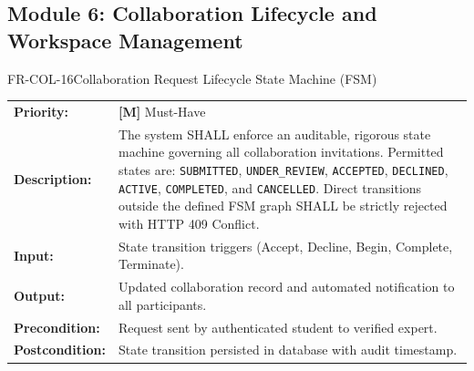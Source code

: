 \documentclass[11pt,a4paper]{article}
\begin{document}
\subsection{Module 6: Collaboration Lifecycle and Workspace Management}

\begin{reqbox}{FR-COL-16}{Collaboration Request Lifecycle State Machine (FSM)}
\begin{tabularx}{\textwidth}{@{}lX@{}}
\textbf{Priority:} & \textbf{[M]} Must-Have \\
\textbf{Description:} & The system SHALL enforce an auditable, rigorous state machine governing all collaboration invitations. Permitted states are: \texttt{SUBMITTED}, \texttt{UNDER\_REVIEW}, \texttt{ACCEPTED}, \texttt{DECLINED}, \texttt{ACTIVE}, \texttt{COMPLETED}, and \texttt{CANCELLED}. Direct transitions outside the defined FSM graph SHALL be strictly rejected with HTTP 409 Conflict. \\
\textbf{Input:} & State transition triggers (Accept, Decline, Begin, Complete, Terminate). \\
\textbf{Output:} & Updated collaboration record and automated notification to all participants. \\
\textbf{Precondition:} & Request sent by authenticated student to verified expert. \\
\textbf{Postcondition:} & State transition persisted in database with audit timestamp. \\
\end{tabularx}
\end{reqbox}
\end{document}
